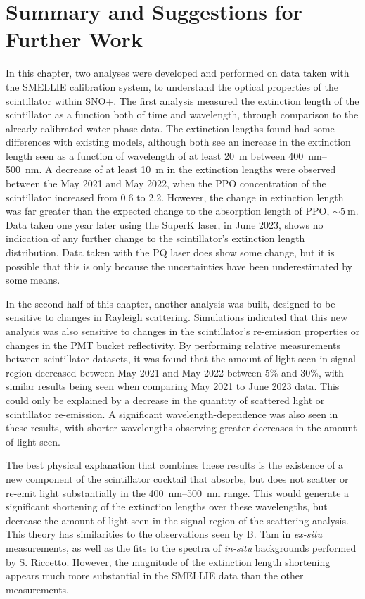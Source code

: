 \section{Summary and Suggestions for Further Work}
In this chapter, two analyses were developed and performed on data taken with the SMELLIE calibration system, to understand the optical properties of the scintillator within SNO+. The first analysis measured the extinction length of the scintillator as a function both of time and wavelength, through comparison to the already-calibrated water phase data. The extinction lengths found had some differences with existing models, although both see an increase in the extinction length seen as a function of wavelength of at least \SI{20}{\metre} between \SIrange{400}{500}{\nm}. A decrease of at least \SI{10}{\metre} in the extinction lengths were observed between the May 2021 and May 2022, when the PPO concentration of the scintillator increased from \SI{0.6}{\gpl} to \SI{2.2}{\gpl}. However, the change in extinction length was far greater than the expected change to the absorption length of PPO, $\sim\SI{5}{\metre}$. Data taken one year later using the SuperK laser, in June 2023, shows no indication of any further change to the scintillator's extinction length distribution. Data taken with the PQ laser does show some change, but it is possible that this is only because the uncertainties have been underestimated by some means.

In the second half of this chapter, another analysis was built, designed to be sensitive to changes in Rayleigh scattering. Simulations indicated that this new analysis was also sensitive to changes in the scintillator's  re-emission properties or changes in the PMT bucket reflectivity. By performing relative measurements between scintillator datasets, it was found that the amount of light seen in signal region decreased between May 2021 and May 2022 between 5\% and 30\%, with similar results being seen when comparing May 2021 to June 2023 data. This could only be explained by a decrease in the quantity of scattered light or scintillator re-emission. A significant wavelength-dependence was also seen in these results, with shorter wavelengths observing greater decreases in the amount of light seen.

The best physical explanation that combines these results is the existence of a new component of the scintillator cocktail that absorbs, but does not scatter or re-emit light substantially in the \SIrange{400}{500}{\nm} range. This would generate a significant shortening of the extinction lengths over these wavelengths, but decrease the amount of light seen in the signal region of the scattering analysis. This theory has similarities to the observations seen by B. Tam in \textit{ex-situ} measurements, as well as the fits to the spectra of \textit{in-situ} backgrounds performed by S. Riccetto. However, the magnitude of the extinction length shortening appears much more substantial in the SMELLIE data than the other measurements.

